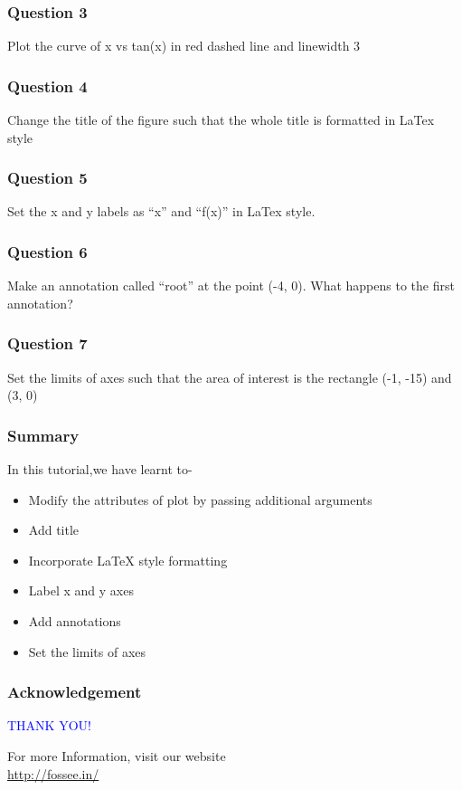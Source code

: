 \documentclass[presentation]{beamer}
\begin{document}
\begin{frame}
\frametitle{Question 3}
\label{sec-5}

  Plot the curve of x vs tan(x) in red dashed line and linewidth 3
\end{frame}
\begin{frame}
\frametitle{Question 4}
\label{sec-6}

  Change the title of the figure such that the whole title is
  formatted in LaTex style
\end{frame}
\begin{frame}
\frametitle{Question 5}
\label{sec-7}

  Set the x and y labels as ``x'' and ``f(x)'' in LaTex style.
\end{frame}
\begin{frame}
\frametitle{Question 6}
\label{sec-8}

  Make an annotation called ``root'' at the point (-4, 0). What happens
  to the first annotation?
\end{frame}
\begin{frame}
\frametitle{Question 7}
\label{sec-9}

  Set the limits of axes such that the area of interest is the
  rectangle (-1, -15) and (3, 0)
\end{frame}
\begin{frame}
\frametitle{Summary}
\label{sec-10}

  In this tutorial,we have learnt to-

\begin{itemize}
\item Modify the attributes of plot by passing additional arguments
\item Add title
\item Incorporate \LaTeX{} style formatting
\item Label x and y axes
\item Add annotations
\item Set the limits of axes
\end{itemize}
\end{frame}
\begin{frame}
\frametitle{Acknowledgement}
\label{sec-11}

  \begin{block}{}
  \begin{center}
  \textcolor{blue}{\Large THANK YOU!} 
  \end{center}
  \end{block}
\begin{block}{}
  \begin{center}
    For more Information, visit our website\\
    \url{http://fossee.in/}
  \end{center}  
  \end{block}
\end{frame}
\end{document}
